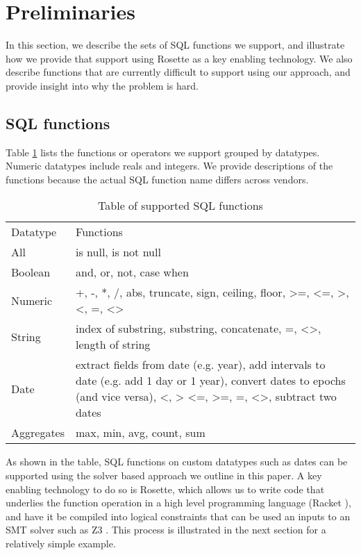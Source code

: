 \section{Preliminaries}\label{prelims}

In this section, we describe the sets of SQL functions we support, and illustrate how we provide that support using Rosette as a key enabling technology. We also describe functions that are currently difficult to support using our approach, and provide insight into why the problem is hard. 
 
\subsection{SQL functions}
Table \ref{table:SQL} lists the functions or operators we support grouped by datatypes.  Numeric datatypes include reals and integers. We provide descriptions of the functions because the actual SQL function name differs across vendors.

\begin{table}[h!]
\centering
\begin{tabularx}{250pt}{|l|X| }
\hline
Datatype & Functions \\
All & is null, is not null \\
Boolean & and, or, not, case when  \\
Numeric & +, -, *, /, abs, truncate, sign, ceiling, floor, >=, <=, >, <, =, <>  \\
String & index of substring, substring, concatenate, =, <>, length of string \\
Date & extract fields from date (e.g. year), add intervals to date (e.g. add 1 day or 1 year), convert dates to epochs (and vice versa), <, > <=, >=, =, <>, subtract two dates \\
Aggregates & max, min, avg, count, sum \\
\hline
\end{tabularx}
\caption{Table of supported SQL functions}
\label{table:SQL}
\end{table}

As shown in the table, SQL functions on custom datatypes such as dates can be supported using the solver based approach we outline in this paper.  A key enabling technology to do so is Rosette, which allows us to write code that underlies the function operation in a high level programming language (Racket \cite{Racket}), and have it be compiled into logical constraints that can be used an inputs to an SMT solver such as Z3 \cite{Z3}.  This process is illustrated in the next section for a relatively simple example.

